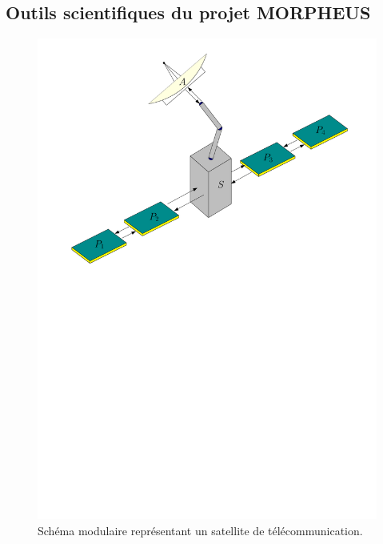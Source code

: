 \documentclass[12pt, french]{article}
\begin{document}
\subsection{Outils scientifiques du projet MORPHEUS}

\begin{figure}[tb]
	\centering
	\includegraphics[width=.6\textwidth]{satellite.pdf}
	\caption{Schéma modulaire représentant un satellite de télécommunication.}
	\label{fig:satellite}
\end{figure}
\end{document}
